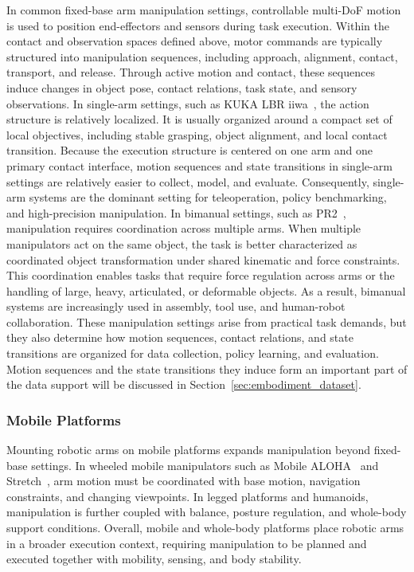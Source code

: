 \documentclass[acmsmall,screen,review]{acmart}
\begin{document}
In common fixed-base arm manipulation settings, controllable multi-DoF motion is used to position end-effectors and sensors during task execution. 
Within the contact and observation spaces defined above, motor commands are typically structured into manipulation sequences, including approach, alignment, contact, transport, and release. 
Through active motion and contact, these sequences induce changes in object pose, contact relations, task state, and sensory observations.
In single-arm settings, such as KUKA LBR iiwa~\cite{mokaram2017rosiiwa}, the action structure is relatively localized. 
It is usually organized around a compact set of local objectives, including stable grasping, object alignment, and local contact transition. 
Because the execution structure is centered on one arm and one primary contact interface, motion sequences and state transitions in single-arm settings are relatively easier to collect, model, and evaluate. 
Consequently, single-arm systems are the dominant setting for teleoperation, policy benchmarking, and high-precision manipulation.
In bimanual settings, such as PR2~\cite{wyrobek2008personal}, manipulation requires coordination across multiple arms. 
When multiple manipulators act on the same object, the task is better characterized as coordinated object transformation under shared kinematic and force constraints. 
This coordination enables tasks that require force regulation across arms or the handling of large, heavy, articulated, or deformable objects. 
As a result, bimanual systems are increasingly used in assembly, tool use, and human-robot collaboration.
These manipulation settings arise from practical task demands, but they also determine how motion sequences, contact relations, and state transitions are organized for data collection, policy learning, and evaluation.
Motion sequences and the state transitions they induce form an important part of the data support will be discussed in Section~\ref{sec:embodiment_dataset}.

\subsubsection{Mobile Platforms}\label{subsec:mobile_platforms}

Mounting robotic arms on mobile platforms expands manipulation beyond fixed-base settings.
In wheeled mobile manipulators such as Mobile ALOHA~\cite{fu2024mobile} and Stretch~\cite{chase2025dynamics}, arm motion must be coordinated with base motion, navigation constraints, and changing viewpoints.
In legged platforms and humanoids, manipulation is further coupled with balance, posture regulation, and whole-body support conditions.
Overall, mobile and whole-body platforms place robotic arms in a broader execution context, requiring manipulation to be planned and executed together with mobility, sensing, and body stability.
\end{document}
